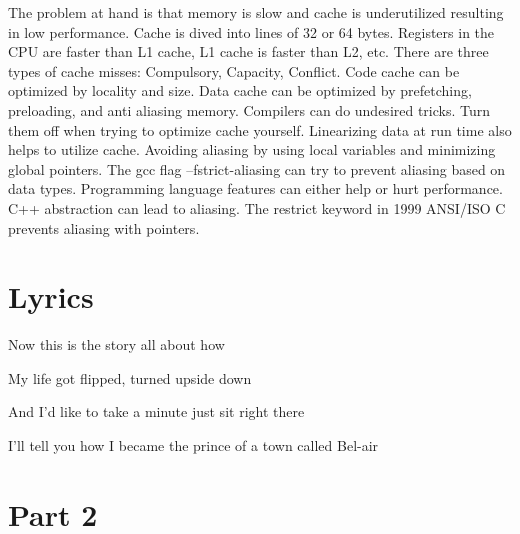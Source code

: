\documentclass[letterpaper,10pt,titlepage]{article}
\begin{document}
The problem at hand is that memory is slow and cache is underutilized resulting in low performance. Cache is dived into lines of 32 or 64 bytes. Registers in the CPU are faster than L1 cache, L1 cache is faster than L2, etc. There are three types of cache misses: Compulsory, Capacity, Conflict. Code cache can be optimized by locality and size. Data cache can be optimized by prefetching, preloading, and anti aliasing memory. Compilers can do undesired tricks. Turn them off when trying to optimize cache yourself. Linearizing  data at run time also helps to utilize cache. Avoiding aliasing by using local variables and minimizing global pointers. The gcc flag –fstrict-aliasing can try to prevent aliasing based on data types. Programming language features can either help or hurt performance. C++ abstraction can lead to aliasing. The restrict keyword in 1999 ANSI/ISO C prevents aliasing with pointers.

\newpage
\section*{Lyrics}
Now this is the story all about how

My life got flipped, turned upside down

And I'd like to take a minute just sit right there

I'll tell you how I became the prince of a town called Bel-air 

\section*{Part 2}

\end{document}
